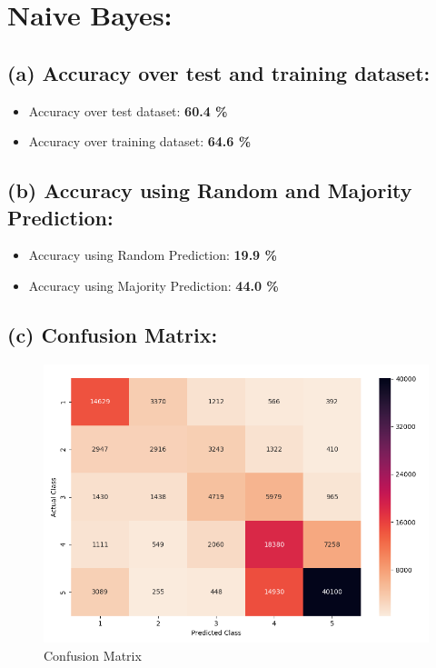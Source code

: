 \documentclass[a4 paper]{article}
\begin{document}

\vspace*{-4mm}
\section{Naive Bayes:}
\subsection*{(a) Accuracy over test and training dataset:}
	\begin{itemize}
	\item Accuracy over test dataset: \textbf{60.4 \%}
	\item Accuracy over training dataset: \textbf{64.6 \%}
	\end{itemize}

\subsection*{(b) Accuracy using Random and Majority Prediction:}
	\begin{itemize}
	\item Accuracy using Random Prediction: \textbf{19.9 \%}
	\item Accuracy using Majority Prediction: \textbf{44.0 \%}
	\end{itemize}

\subsection*{(c) Confusion Matrix:}
	\begin{figure}[ht!]
		\centering %
		\includegraphics[width=150mm]{extra/1c.png}
		\caption{Confusion Matrix\label{MIMD}}
	\end{figure}
\end{document}
